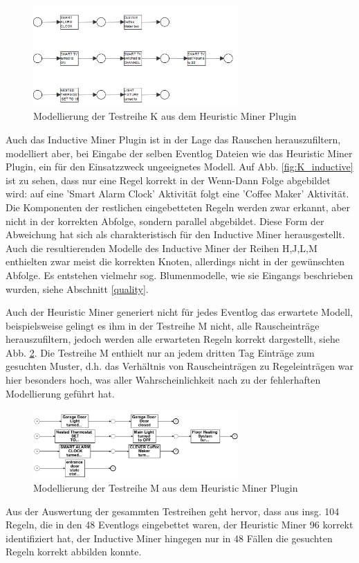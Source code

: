 \begin{figure}[!h]
    \centering
    \includegraphics[width=0.7\textwidth,]{figures/Appbildungen/K_heuristic_correct.PNG}
    \caption{Modellierung der Testreihe K aus dem Heuristic Miner Plugin}
    \label{fig:K_heuristic}
\end{figure}
Auch das Inductive Miner Plugin ist in der Lage das Rauschen herauszufiltern, modelliert aber, bei Eingabe der selben Eventlog Dateien wie das Heuristic Miner Plugin, ein für den Einsatzzweck ungeeignetes Modell. 
Auf Abb. \ref{fig:K_inductive} ist zu sehen, dass nur eine Regel korrekt in der Wenn-Dann Folge abgebildet wird: auf eine 'Smart Alarm Clock' Aktivität folgt eine 'Coffee Maker' Aktivität. Die Komponenten der restlichen eingebetteten Regeln werden zwar erkannt, aber nicht in der korrekten Abfolge, sondern parallel abgebildet. Diese Form der Abweichung hat sich als charakteristisch für den Inductive Miner herausgestellt. Auch die resultierenden Modelle des Inductive Miner der Reihen H,J,L,M enthielten zwar meist die korrekten Knoten, allerdings nicht in der gewünschten Abfolge. Es entstehen vielmehr sog. Blumenmodelle, wie sie Eingangs beschrieben wurden, siehe Abschnitt \ref{quality}.

Auch der Heuristic Miner generiert nicht für jedes Eventlog das erwartete Modell, beispielsweise gelingt es ihm in der Testreihe M nicht, alle Rauscheinträge herauszufiltern, jedoch werden alle erwarteten Regeln korrekt dargestellt, siehe Abb. \ref{fig:M_heuristic}. 
Die Testreihe M enthielt nur an jedem dritten Tag Einträge zum gesuchten Muster, d.h. das Verhältnis von Rauscheinträgen zu Regeleinträgen war hier besonders hoch, was aller Wahrscheinlichkeit nach zu der fehlerhaften Modellierung geführt hat.
\begin{figure}[!ht]
    \centering
    \includegraphics[width=0.7\textwidth,]{figures/Appbildungen/M_Heuristic.PNG}
    \caption{Modellierung der Testreihe M aus dem Heuristic Miner Plugin}
    \label{fig:M_heuristic}
\end{figure}
Aus der Auswertung der gesammten Testreihen geht hervor, dass aus insg. 104 Regeln, die in den 48 Eventlogs eingebettet waren, der Heuristic Miner 96 korrekt identifiziert hat, der Inductive Miner hingegen nur in 48 Fällen die gesuchten Regeln korrekt abbilden konnte.

